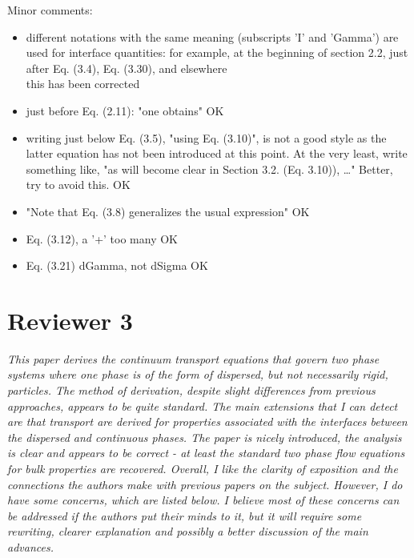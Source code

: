 \documentclass[10pt,a4paper]{article}
\newcommand{\tb}[1]{\color{blue}#1\color{black}}
\begin{document}
Minor comments:
\begin{itemize}
    \item  different notations with the same meaning (subscripts 'I' and 'Gamma') are used for interface quantities: for example, at the beginning of section 2.2, just after Eq. (3.4), Eq. (3.30), and elsewhere
    \\
    \tb{this has been corrected}
    \item just before Eq. (2.11): "one obtains" \tb{OK}
    \item writing just below Eq. (3.5), "using Eq. (3.10)", is not a good style as the latter equation has not been introduced at this point. At the very least, write something like, "as will become clear in Section 3.2. (Eq. 3.10)), …" Better, try to avoid this. \tb{OK}
    \item "Note that Eq. (3.8) generalizes the usual expression" \tb{OK}
    \item Eq. (3.12), a '+' too many \tb{OK}
    \item Eq. (3.21) dGamma, not dSigma \tb{OK}
\end{itemize}

\section*{Reviewer 3}

\textit{This paper derives the continuum transport equations that govern two phase systems where
one phase is of the form of dispersed, but not necessarily rigid, particles. The method of
derivation, despite slight differences from previous approaches, appears to be quite standard.
The main extensions that I can detect are that transport are derived for properties associated
with the interfaces between the dispersed and continuous phases. The paper is nicely
introduced, the analysis is clear and appears to be correct - at least the standard two phase
flow equations for bulk properties are recovered. Overall, I like the clarity of exposition and
the connections the authors make with previous papers on the subject.
However, I do have some concerns, which are listed below. I believe most of these concerns
can be addressed if the authors put their minds to it, but it will require some rewriting, clearer
explanation and possibly a better discussion of the main advances.}
\end{document}
